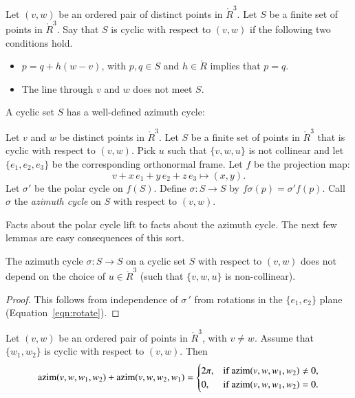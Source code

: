 \begin{definition} Let $(v,w)$ be an ordered pair of distinct points in
$\ring{R}^3$.
Let $S$ be a finite set of points in $\ring{R}^3$.
Say that $S$ is cyclic with respect to $(v,w)$ if
the following two conditions hold.
\begin{itemize}
\item $p = q + h (w-v)$, with $p,q\in S$ and $h\in \ring{R}$
implies that $p=q$.  
\item  The line through $v$ and $w$ does not meet $S$.
\end{itemize}
\end{definition}
%

A cyclic set $S$ has a well-defined azimuth cycle:

\begin{definition}
Let $v$ and $w$ be distinct points in
$\ring{R}^3$.
Let $S$ be a finite set of points in $\ring{R}^3$ that is
cyclic  with respect to $(v,w)$.  Pick $u$ such that $\{v,w,u\}$ is not collinear and let $\{e_1,e_2,e_3\}$ be the corresponding orthonormal frame.
Let $f$ be the projection map:
   $$v + x\, e_1 + y\, e_2 + z\, e_3 \mapsto
     (x,y).$$
Let $\sigma'$ be the polar cycle on $f(S)$. Define 
$\sigma:S\to S$ by $f\sigma(p) =\sigma'f(p)$.
Call $\sigma$ the {\it azimuth cycle}
on $S$ with respect to $(v,w)$.
%
%
%
%
%
\end{definition}

Facts about the polar cycle lift to facts about the azimuth cycle.
The next few lemmas are easy consequences of this sort.


\begin{lemma} The azimuth cycle $\sigma:S\to S$ on
a cyclic set $S$ with respect to $(v,w)$ does not depend
on the choice of $u\in\ring{R}^3$ (such that $\{v,w,u\}$ is non-collinear).
\end{lemma}
%
%

\begin{proof} This follows from independence of $\sigma\,'$ from
rotations in the $\{e_1,e_2\}$ plane  (Equation~\ref{eqn:rotate}).
\end{proof}


\begin{lemma} 
Let $(v,w)$ be an ordered pair of points in $\ring{R}^3$,
with $v\ne w$.  Assume that $\{w_1,w_2\}$ is cyclic
with respect to $(v,w)$.  Then
  $$
  {\operatorname{azim}}(v,w,w_1,w_2) + {\operatorname{azim}}(v,w,w_2,w_1) 
  = \begin{cases} 2\pi, & \text{if }{\operatorname{azim}}(v,w,w_1,w_2)\ne 0,\\
    0, & \text{if }{\operatorname{azim}}(v,w,w_1,w_2)=0.
    \end{cases}
    $$
\end{lemma}
%

